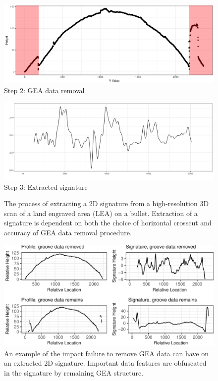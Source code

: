 \documentclass[12pt]{article}
\begin{document}
\begin{figure}
\begin{minipage}[b]{0.45\linewidth}
    \raggedleft
    \includegraphics[width=\textwidth]{../images/Profile_1_red_grooves.png}
    \centering
    Step 2: GEA data removal
\end{minipage}
\hspace{.2cm}
\begin{minipage}[b]{0.45\linewidth}
    \raggedright
    \includegraphics[width=\textwidth]{../images/signature.png}
    \centering
    Step 3: Extracted signature
\end{minipage}
\caption{The process of extracting a 2D signature from a high-resolution 3D scan of a land engraved area (LEA) on a bullet. Extraction of a signature is dependent on both the choice of horizontal crosscut and accuracy of GEA data removal procedure.}  
\label{processing-process}
\end{figure}

\begin{figure}
\centering
\includegraphics{writeup_files/figure-latex/groove-no-groove-1.pdf}
\caption{\label{groove-no-groove}An example of the impact failure to
remove GEA data can have on an extracted 2D signature. Important data
features are obfuscated in the signature by remaining GEA structure.}
\end{figure}
\end{document}
